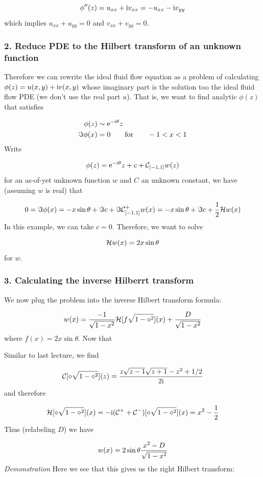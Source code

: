 \documentclass[12pt,a4paper]{article}
\def\I{ {\rm i} }
\def\E{ {\rm e} }
\def\CC{ {\cal C} }
\def\HH{ {\cal H} }
\begin{document}
\[
    \phi''(z) = u_{xx} + \I v_{xx} = -u_{xx} -\I v_{yy} 
\]
which implies $u_{xx} + u_{yy} = 0$ and $v_{xx} + v_{yy} = 0$.

\subsubsection{2. Reduce PDE to the Hilbert transform of an unknown function}
Therefore we can rewrite the ideal fluid flow equation as a problem of calculating $\phi(z) = u(x,y) + \I v(x,y)$  whose imaginary part is the solution too the ideal fluid flow PDE (we don't use the real part $u$). That is, we  want to find analytic $\phi(z)$ that satisfies


\begin{align*}
    \phi(z) &\sim \E^{-\I \theta} z \\
    \Im \phi(x) &= 0  \qquad\hbox{for}\qquad -1 < x < 1
\end{align*}
Write

\[
\phi(z) = \E^{-\I \theta} z + c + \CC_{[-1,1]} w(z)
\]
for an as-of-yet unknown function $w$ and $C$ an unknown constant, we have (assuming $w$ is real) that

\[
0 = \Im \phi(x) = -x \sin \theta + \Im c + \Im \CC_{[-1,1]}^+ w(x) = -x \sin \theta + \Im c +{1 \over 2} \HH w(x)
\]
In this example, we can take $c = 0$. Therefore, we want to solve

\[
\HH w(x) =  2 x  \sin \theta
\]
for $w$.  

\subsubsection{3. Calculating the inverse Hilberrt transform}
We now plug the problem into the inverse Hilbert transform formula:

\[
    w(x) = {- 1\over \sqrt{1-x^2}} {\cal H}[f \sqrt{1-\diamond^2}](x)  + {D \over \sqrt{1-x^2}}
\]
where $f(x) = 2 x \sin \theta$. Now that

Similar to last lecture, we find

\[
{\cal C}[\diamond \sqrt{1-\diamond^2}](z) = {z \sqrt{z-1} \sqrt{z+1} - z^2 + 1/2 \over 2 \I }
\]
and therefore

\[
{\cal H}[\diamond \sqrt{1-\diamond^2}](x) = -\I({\cal C}^+ + {\cal C}^-)[\diamond \sqrt{1-\diamond^2}](x) = x^2 - {1 \over 2} 
\]
Thus (relabeling $D$) we have

\[
w(x) = 2\sin \theta {x^2-D  \over \sqrt{1-x^2}} 
\]
\emph{Demonstration} Here we see that this gives us the right Hilbert transform:
\end{document}
